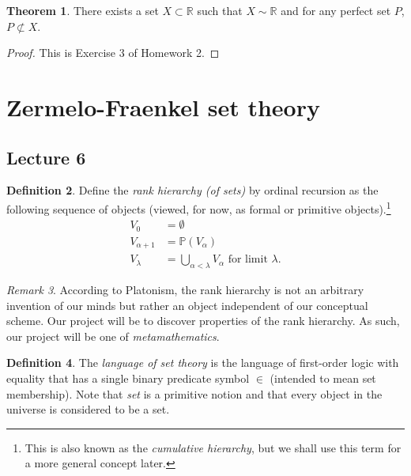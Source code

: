 \documentclass[10pt,letterpaper,cm]{nupset}
\theoremstyle{definition}
\newtheorem{definition}{Definition}[subsection]
\theoremstyle{theorem}
\newtheorem{theorem}[definition]{Theorem}
\theoremstyle{remark}
\newtheorem{remark}[definition]{Remark}
\renewcommand{\P}{\mathbb P}
\newcommand{\R}{\mathbb R}
\newcommand{\1}{\mathbf{1}}
\newcommand{\0}{\vec 0}
\begin{document}
\begin{theorem}
There exists a set $X\subset \R$ such that $X \sim \R$ and for any perfect set $P$, $P\not\subset X$.
\end{theorem}
\begin{proof}
This is Exercise 3 of Homework 2.
\end{proof}

\section{Zermelo-Fraenkel set theory}

\subsection{Lecture 6}

\begin{definition}
Define the \textit{rank hierarchy (of sets)} by ordinal recursion as the following sequence of objects (viewed, for now, as formal or primitive objects).\footnote{This is also known as the \textit{cumulative hierarchy}, but we shall use this term for a more general concept later.}
\begin{align*}
V_0 & = \emptyset
\\ V_{\alpha +1} & = \P(V_{\alpha})
\\ V_{\lambda} & = \bigcup_{\alpha < \lambda} V_{\alpha} \text{ for limit $\lambda$}.
\end{align*} 
\end{definition}

\begin{remark}
According to Platonism, the rank hierarchy is not an arbitrary invention of our minds but rather an object independent of our conceptual scheme. Our project will be to discover properties of the rank hierarchy. As such, our project will be one of \emph{metamathematics}. 
\end{remark}


\begin{definition}
The \textit{language of set theory} is the language of first-order logic with equality that has a single binary predicate symbol $\in$ (intended to mean set membership). Note that \textit{set} is a primitive notion and that every object in the universe is considered to be a set.
\end{definition}
\end{document}
